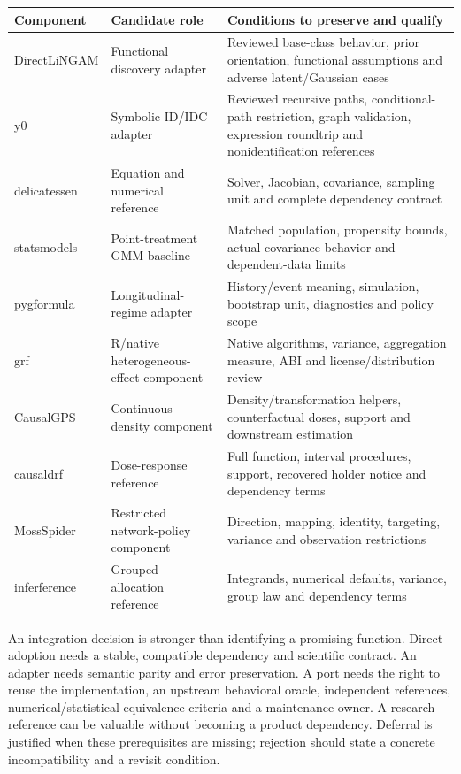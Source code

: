 \begin{longtable}{P{0.18\textwidth}P{0.34\textwidth}P{0.39\textwidth}}
\toprule
Component & Candidate role & Conditions to preserve and qualify\\
\midrule
\endhead
DirectLiNGAM & Functional discovery adapter & Reviewed base-class behavior, prior orientation,
functional assumptions and adverse latent/Gaussian cases\\
y0 & Symbolic ID/IDC adapter & Reviewed recursive paths, conditional-path restriction,
graph validation, expression roundtrip and nonidentification references\\
delicatessen & Equation and numerical reference & Solver, Jacobian, covariance,
sampling unit and complete dependency contract\\
statsmodels & Point-treatment GMM baseline & Matched population, propensity bounds,
actual covariance behavior and dependent-data limits\\
pygformula & Longitudinal-regime adapter & History/event meaning, simulation,
bootstrap unit, diagnostics and policy scope\\
grf & R/native heterogeneous-effect component & Native algorithms, variance,
aggregation measure, ABI and license/distribution review\\
CausalGPS & Continuous-density component & Density/transformation helpers,
counterfactual doses, support and downstream estimation\\
causaldrf & Dose-response reference & Full function, interval procedures,
support, recovered holder notice and dependency terms\\
MossSpider & Restricted network-policy component & Direction, mapping, identity,
targeting, variance and observation restrictions\\
inferference & Grouped-allocation reference & Integrands, numerical defaults,
variance, group law and dependency terms\\
\bottomrule
\end{longtable}

An integration decision is stronger than identifying a promising function.
Direct adoption needs a stable, compatible dependency and scientific contract.
An adapter needs semantic parity and error preservation. A port needs the right
to reuse the implementation, an upstream behavioral oracle, independent
references, numerical/statistical equivalence criteria and a maintenance owner.
A research reference can be valuable without becoming a product dependency.
Deferral is justified when these prerequisites are missing; rejection should
state a concrete incompatibility and a revisit condition.


